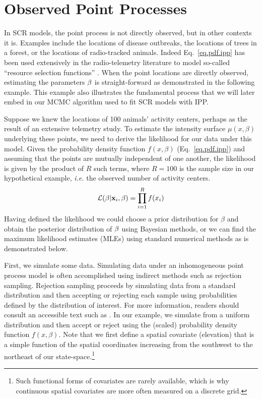 \section{Observed Point Processes}

In SCR models, the point process is not directly observed, but in
other contexts it is. Examples include the locations of disease
outbreaks, the locations of trees in a forest, or the locations of
radio-tracked animals. Indeed Eq.~\ref{eq.pdf.ipp} has been used
extensively in the radio-telemetry literature to model so-called
``resource selection functions'' \citep{manly_etal:2002,lele_keim:2006}.
When the point locations are directly observed,
estimating the parameters $\bf \beta$ is straight-forward as
demonstrated in the following example. This example also illustrates
the fundamental process that we will later embed in our MCMC algorithm
used to fit SCR models with IPP.

Suppose we knew the locations of 100 animals' activity
centers, perhaps as the result of an extensive telemetry study. To
estimate the intensity surface $\mu(x, \beta)$ underlying these
points, we need to derive the likelihood for our data under this
model. Given the probability density function $f(x, \beta)$
(Eq.~\ref{eq.pdf.ipp}) and assuming that the points are
mutually independent of one another,
the likelihood is given by the product
of $R$ such terms, where $R=100$ is the sample size in our
hypothetical example,
\emph{i.e.} the observed number of activity centers.
\[
\mathcal{L}({\bf \beta} | {\bf x}_i, \beta) = \prod_{i=1}^R f(x_i)
\]
Having defined the likelihood we could choose a prior distribution for
$\beta$ and obtain the posterior distribution of
$\bf \beta$ using Bayesian methods, or we can find the maximum likelihood
estimates (MLEs) using standard numerical methods as is demonstrated
below.

First, we simulate some data. Simulating data under an inhomogeneous point process model is often
accomplished using indirect methods such as rejection
sampling. Rejection sampling proceeds by
simulating data from a standard distribution and then accepting or
rejecting each sample using probabilities defined by the distribution
of interest. For more information, readers should consult an
accessible text such as \citet{robert_casella:2010}. In our example, we
simulate from a uniform distribution and then accept or reject using
the (scaled) probability density function $f(x, \beta)$. Note that we first define a
spatial covariate (elevation) that is a simple function of the spatial
coordinates increasing from the southwest to the northeast of our
state-space.\footnote{Such functional forms of
covariates are rarely available, which is why continuous spatial
covariates are more often measured on a discrete grid.}

